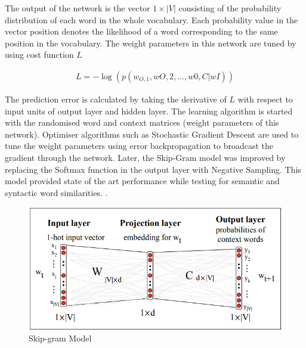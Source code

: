 \documentclass[12pt]{report} %
\begin{document}
The output of the network is the vector $1\times|V|$ consisting of the probability distribution of each word in the whole vocabulary. Each probability value in the vector position denotes the likelihood of a word corresponding to the same position in the vocabulary. The weight parameters in this network are tuned by using cost function $L$

\begin{align}
L = - \log ( p(w_{O,1}, wO,2, . . . , w0,C|wI))
\end{align} 

The prediction error is calculated by taking the derivative of $L$ with respect to input units of output layer and hidden layer. The learning algorithm is started with the randomised word and context matrices (weight parameters of this network). Optimiser algorithms such as Stochastic Gradient Descent are used to tune the weight parameters using error backpropagation to broadcast the gradient through the network. Later, the Skip-Gram model was improved by replacing the Softmax function in the output layer with Negative Sampling. This model provided state of the art performance while testing for semantic and syntactic word similarities. \citep{mikolov2014word2vec}. 


\begin{figure}[!tbp]
	\centering
	\includegraphics[scale=0.50]{image/skip-gram.png}
	\caption{Skip-gram Model \citep{jurafsky2014speech}}
	\label{skipgram}
\end{figure}
\end{document}
